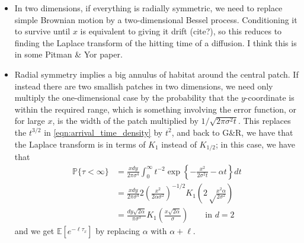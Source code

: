 \documentclass{article}
\newcommand{\E}{\mathbb{E}}
\renewcommand{\P}{\mathbb{P}}
\newcommand{\var}{\mathop{\mbox{Var}}}
\begin{document}
\begin{itemize}

\item In two dimensions, if everything is radially symmetric, we need to replace simple Brownian motion by a two-dimensional Bessel process.
Conditioning it to survive until $x$ is equivalent to giving it drift (cite?),
so this reduces to finding the Laplace transform of the hitting time of a diffusion.
I think this is in some Pitman \& Yor paper.

\item Radial symmetry implies a big annulus of habitat around the central patch.
If instead there are two smallish patches in two dimensions, 
we need only multiply the one-dimensional case by the probability that the $y$-coordinate is within the required range,
which is something involving the error function, or for large $x$,
is the width of the patch multiplied by $1/\sqrt{2 \pi \sigma^2 t}$.  
This replaces the $t^{3/2}$ in \eqref{eqn:arrival_time_density} by $t^2$, and back to G\&R, we have that the Laplace transform is in terms of $K_{1}$ instead of $K_{1/2}$;
in this case, we have that
\begin{align}
    \P\{ \tau < \infty \} &= \frac{x dy}{2\pi \sigma^4} \int_0^\infty t^{-2} \exp\left\{-\frac{x^2}{2\sigma^2 t} - \alpha t \right\} dt \\
                          &= \frac{x dy}{2\pi \sigma^4} 2 \left( \frac{ x^2 }{ 2 \alpha \sigma^2 } \right)^{-1/2} K_1\left(2 \sqrt\frac{x^2 \alpha}{2\sigma^2} \right) \\
                          &= \frac{dy\sqrt{2\alpha}}{\pi \sigma^3} K_1\left(\frac{x \sqrt{2\alpha}}{\sigma} \right)  \qquad \text{in } d=2
\end{align}
and we get $\E[e^{-\ell \tau_x}]$ by replacing $\alpha$ with $\alpha+\ell$.

% 
% 
\end{itemize}
\end{document}
